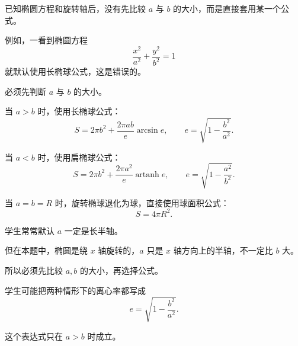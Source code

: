 \begin{trapbox}
\begin{description}[style=nextline, leftmargin=2.8em, labelsep=0.5em, itemsep=0.45em]
	\end{description}

	\medskip


	\begin{description}[style=nextline, leftmargin=2.8em, labelsep=0.5em, itemsep=0.45em]

		\item[\textbf{\textcolor{CTrap}{易错点二（公式选择错误）：}}]
		      已知椭圆方程和旋转轴后，没有先比较 $a$ 与 $b$ 的大小，而是直接套用某一个公式。

		      例如，一看到椭圆方程
		      \[
			      \frac{x^{2}}{a^{2}}+\frac{y^{2}}{b^{2}}=1
		      \]
		      就默认使用长椭球公式，这是错误的。

		\item[\textbf{\textcolor{CTrap}{正确理解：}}]
		      必须先判断 $a$ 与 $b$ 的大小。

		      当 $a>b$ 时，使用长椭球公式：
		      \[
			      S
			      =
			      2\pi b^{2}
			      +
			      \frac{2\pi ab}{e}\arcsin e,
			      \qquad
			      e=\sqrt{1-\frac{b^{2}}{a^{2}}}.
		      \]

		      当 $a<b$ 时，使用扁椭球公式：
		      \[
			      S
			      =
			      2\pi b^{2}
			      +
			      \frac{2\pi a^{2}}{e}\operatorname{artanh} e,
			      \qquad
			      e=\sqrt{1-\frac{a^{2}}{b^{2}}}.
		      \]

		      当 $a=b=R$ 时，旋转椭球退化为球，直接使用球面积公式：
		      \[
			      S=4\pi R^{2}.
		      \]

		\item[\textbf{\textcolor{CTrap}{错因分析：}}]
		      学生常常默认 $a$ 一定是长半轴。

		      但在本题中，椭圆是绕 $x$ 轴旋转的，$a$ 只是 $x$ 轴方向上的半轴，不一定比 $b$ 大。

		      所以必须先比较 $a,b$ 的大小，再选择公式。

	\end{description}

	\medskip

	\begin{description}[style=nextline, leftmargin=2.8em, labelsep=0.5em, itemsep=0.45em]

		\item[\textbf{\textcolor{CTrap}{易错点三（离心率定义混淆）：}}]
		      学生可能把两种情形下的离心率都写成
		      \[
			      e=\sqrt{1-\frac{b^{2}}{a^{2}}}.
		      \]

		      这个表达式只在 $a>b$ 时成立。


\end{description}
\end{trapbox}
